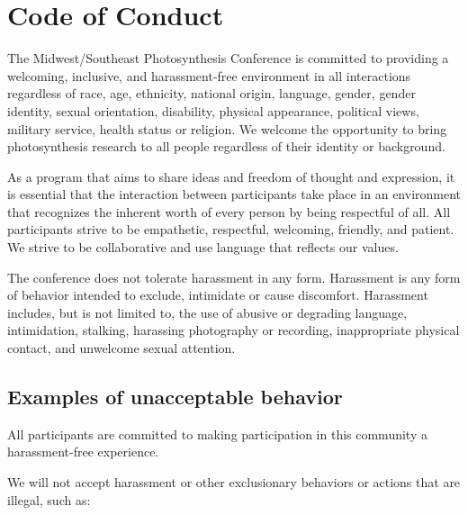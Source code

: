 \section{Code of Conduct}

The Midwest/Southeast Photosynthesis Conference is committed to providing a welcoming, inclusive, and harassment-free environment in all interactions regardless of race, age, ethnicity, national origin, language, gender, gender identity, sexual orientation, disability, physical appearance, political views, military service, health status or religion. We welcome the opportunity to bring photosynthesis research to all people regardless of their identity or background.

As a program that aims to share ideas and freedom of thought and expression, it is essential that the interaction between participants take place in an environment that recognizes the inherent worth of every person by being respectful of all. All participants strive to be empathetic, respectful, welcoming, friendly, and patient. We strive to be collaborative and use language that reflects our values.

The conference does not tolerate harassment in any form. Harassment is any form of behavior intended to exclude, intimidate or cause discomfort. Harassment includes, but is not limited to, the use of abusive or degrading language, intimidation, stalking, harassing photography or recording, inappropriate physical contact, and unwelcome sexual attention.

\subsection{Examples of unacceptable behavior}
All participants are committed to making participation in this community a harassment-free experience.

We will not accept harassment or other exclusionary behaviors or actions that are illegal, such as:

